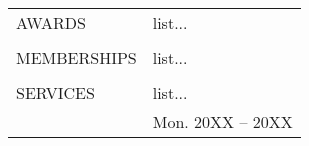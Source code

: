 \begin{singlespace}
\begin{longtable}{p{} p{}}
		AWARDS    
		& list... \vspace{0.05in}
		\\\\
		
		MEMBERSHIPS    
		& list...
		\\\\
		
		SERVICES    
		& list... \\&\hfill Mon. 20XX -- 20XX \\
\end{longtable}\addtocounter{table}{-1}
\end{singlespace}